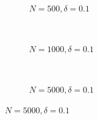 \documentclass{beamer}
\begin{document}
\begin{frame}
  \begin{center}
    {}
  \end{center}
\end{frame}
\begin{frame}
\begin{figure}[h]
  \scriptsize
  \begingroup
  \centering
  \begin{subfigure}[b]{0.31\textwidth}
\caption{\footnotesize $N=500, \delta = 0.1$}
  
  \end{subfigure}
  ~
  \begin{subfigure}[b]{0.31\textwidth}
    \caption{\footnotesize $N=1000, \delta = 0.1$} 
  
  \end{subfigure}
  ~
  \begin{subfigure}[b]{0.31\textwidth}
\caption{\footnotesize $N=5000, \delta = 0.1$}
  
  \end{subfigure}
\endgroup
\end{figure}
\end{frame}
\end{document}
